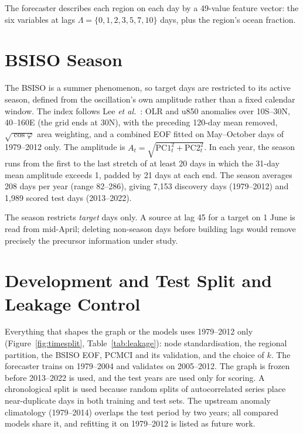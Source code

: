The forecaster describes each region on each day by a 49-value feature vector: the six variables at lags $\Lambda=\{0,1,2,3,5,7,10\}$ days, plus the region's ocean fraction.

\section{BSISO Season}
\label{sec:data-season}

The BSISO is a summer phenomenon, so target days are restricted to its active season, defined from the oscillation's own amplitude rather than a fixed calendar window. The index follows Lee \emph{et al.}~\cite{lee2013realtime}: OLR and u850 anomalies over 10\dg S--30\dg N, 40\dg--160\dg E (the grid ends at 30\dg N), with the preceding 120-day mean removed, $\sqrt{\cos\varphi}$ area weighting, and a combined EOF fitted on May--October days of 1979--2012 only. The amplitude is $A_t=\sqrt{\mathrm{PC1}_t^2+\mathrm{PC2}_t^2}$. In each year, the season runs from the first to the last stretch of at least 20 days in which the 31-day mean amplitude exceeds 1, padded by 21 days at each end. The season averages 208 days per year (range 82--286), giving 7{,}153 discovery days (1979--2012) and 1{,}989 scored test days (2013--2022).

The season restricts \emph{target} days only. A source at lag 45 for a target on 1 June is read from mid-April; deleting non-season days before building lags would remove precisely the precursor information under study.

\section{Development and Test Split and Leakage Control}
\label{sec:data-split}

Everything that shapes the graph or the models uses 1979--2012 only (Figure~\ref{fig:timesplit}, Table~\ref{tab:leakage}): node standardisation, the regional partition, the BSISO EOF, PCMCI and its validation, and the choice of $k$. The forecaster trains on 1979--2004 and validates on 2005--2012. The graph is frozen before 2013--2022 is used, and the test years are used only for scoring. A chronological split is used because random splits of autocorrelated series place near-duplicate days in both training and test sets. The upstream anomaly climatology (1979--2014) overlaps the test period by two years; all compared models share it, and refitting it on 1979--2012 is listed as future work.

